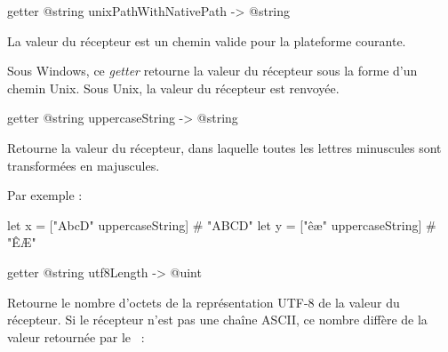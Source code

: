 \begin{galgas3box}
getter @string unixPathWithNativePath -> @string
\end{galgas3box}

La valeur du récepteur est un chemin valide pour la plateforme courante.

Sous Windows, ce \emph{getter} retourne la valeur du récepteur sous la forme d'un chemin Unix. Sous Unix, la valeur du récepteur est renvoyée.














\begin{galgas3box}
getter @string uppercaseString -> @string
\end{galgas3box}

Retourne la valeur du récepteur, dans laquelle toutes les lettres minuscules sont transformées en majuscules.

Par exemple :
\begin{galgas3}
let x = ["AbcD" uppercaseString] # "ABCD"
let y = ["êæ" uppercaseString] # "ÊÆ"
\end{galgas3}














%
















\begin{galgas3box}
getter @string utf8Length -> @uint
\end{galgas3box}

Retourne le nombre d'octets de la représentation UTF-8 de la valeur du récepteur. Si le récepteur n'est pas une chaîne ASCII, ce nombre diffère de la valeur retournée par le ~:

